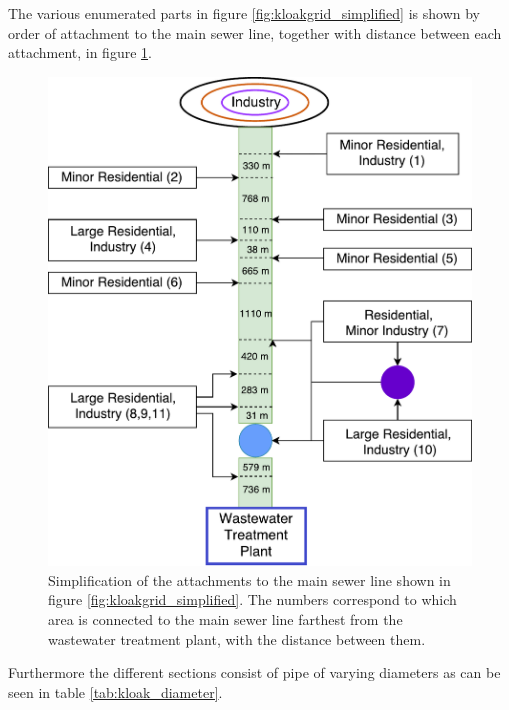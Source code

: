The various enumerated parts in figure \ref{fig:kloakgrid_simplified} is shown by order of attachment to the main sewer line, together with distance between each attachment, in figure \ref{fig:sewer_line_diagram}. 

\begin{figure}[H]
\centering
\includegraphics[width=0.6 \textwidth]{report/system_overview/pictures/sewer_line_diagram.pdf}
\caption{Simplification of the attachments to the main sewer line shown in figure \ref{fig:kloakgrid_simplified}. The numbers correspond to which area is connected to the main sewer line farthest from the wastewater treatment plant, with the distance between them.}
\label{fig:sewer_line_diagram}
\end{figure}

Furthermore the different sections consist of pipe of varying diameters as can be seen in table \ref{tab:kloak_diameter}.


